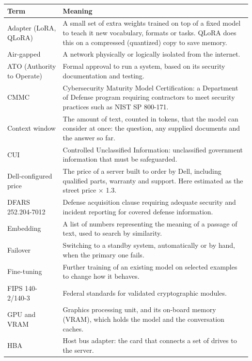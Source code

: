 
{\footnotesize
\begin{xltabular}{\textwidth}{@{}Y{0.55} Y{1.45}@{}}
  \toprule
  Term & Meaning \\
  \midrule
  \endhead
  Adapter (LoRA, QLoRA) & A small set of extra weights trained on top of a fixed model to teach it new vocabulary, formats or tasks. QLoRA does this on a compressed (quantized) copy to save memory. \\
  Air-gapped & A network physically or logically isolated from the internet. \\
  ATO (Authority to Operate) & Formal approval to run a system, based on its security documentation and testing. \\
  CMMC & Cybersecurity Maturity Model Certification: a Department of Defense program requiring contractors to meet security practices such as NIST SP 800-171. \\
  Context window & The amount of text, counted in tokens, that the model can consider at once: the question, any supplied documents and the answer so far. \\
  CUI & Controlled Unclassified Information: unclassified government information that must be safeguarded. \\
  Dell-configured price & The price of a server built to order by Dell, including qualified parts, warranty and support. Here estimated as the street price $\times$ 1.3. \\
  DFARS 252.204-7012 & Defense acquisition clause requiring adequate security and incident reporting for covered defense information. \\
  Embedding & A list of numbers representing the meaning of a passage of text, used to search by similarity. \\
  Failover & Switching to a standby system, automatically or by hand, when the primary one fails. \\
  Fine-tuning & Further training of an existing model on selected examples to change how it behaves. \\
  FIPS 140-2/140-3 & Federal standards for validated cryptographic modules. \\
  GPU and VRAM & Graphics processing unit, and its on-board memory (VRAM), which holds the model and the conversation caches. \\
  HBA & Host bus adapter: the card that connects a set of drives to the server. \\

\end{xltabular}}
